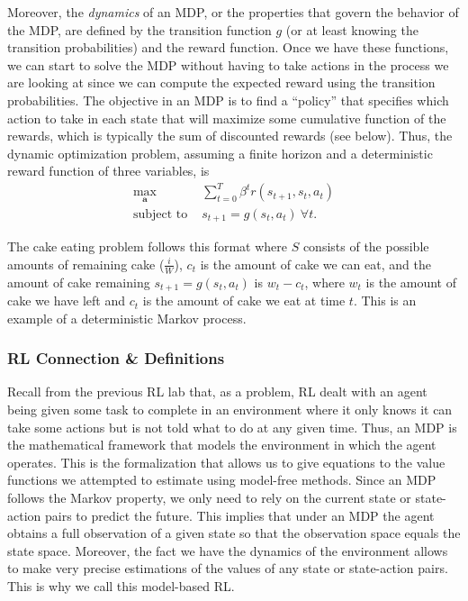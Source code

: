 Moreover, the \emph{dynamics} of an MDP, or the properties that govern the behavior of the MDP, are defined by the transition function $g$ (or at least knowing the transition probabilities) and the reward function.
Once we have these functions, we can start to solve the MDP without having to take actions in the process we are looking at since we can compute the expected reward using the transition probabilities.
The objective in an MDP is to find a ``policy''  that specifies which action to take in each state that will maximize some cumulative function of the rewards, which is typically the sum of discounted rewards (see below).
Thus, the dynamic optimization problem, assuming a finite horizon and a deterministic reward function of three variables, is
\begin{align}
\label{eq:policyiter-dynopt1}
\max_\mathbf{a}  & \sum_{t=0}^{T} \beta^t r(s_{t+1}, s_t,a_t) \\
\mbox{subject to } & s_{t+1}= g(s_t,a_t)\ \forall t \nonumber.
\end{align}


The cake eating problem follows this format where $S$ consists of the possible amounts of remaining cake ($\frac{i}{W}$), $c_t$ is the amount of cake we can eat, and the amount of cake remaining $s_{t+1}=g(s_t,a_t)$ is $w_t-c_t$, where $w_t$ is the amount of cake we have left and $c_t$ is the amount of cake we eat at time $t$.
This is an example of a deterministic Markov process.

\subsubsection*{RL Connection \& Definitions}
Recall from the previous RL lab that, as a problem, RL dealt with an agent being given some task to complete in an environment where it only knows it can take some actions but is not told what to do at any given time.
Thus, an MDP is the mathematical framework that models the environment in which the agent operates.
This is the formalization that allows us to give equations to the value functions we attempted to estimate using model-free methods.
Since an MDP follows the Markov property, we only need to rely on the current state or state-action pairs to predict the future.
This implies that under an MDP the agent obtains a full observation of a given state so that the observation space equals the state space.
Moreover, the fact we have the dynamics of the environment allows to make very precise estimations of the values of any state or state-action pairs.
This is why we call this model-based RL.

